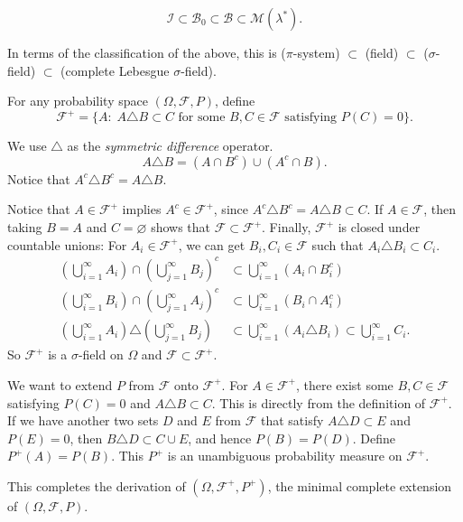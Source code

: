 \documentclass[11pt,fleqn]{book} %
\begin{document}
\[
	\mathcal{I} \subset \mathcal{B}_0 \subset \mathcal{B} \subset \mathcal{M}(\lambda^*).
\]

In terms of the classification of the above, this is ($\pi$-system) $\subset$ (field) $\subset$ ($\sigma$-field) $\subset$ (complete Lebesgue $\sigma$-field).

For any probability space $(\Omega,\mathcal{F},P)$, define
\[
	\mathcal{F}^+ = \{A:\;A \triangle B \subset C \textrm{ for some } B,C \in \mathcal{F} \textrm{ satisfying } P(C)=0\}.
\]
\begin{remark}\label{rem:sym-diff}
	We use $\triangle$ as the \emph{symmetric difference} operator.
	\[
		A \triangle B = (A \cap B^c) \cup (A^c \cap B).
	\]
	Notice that $A^c \triangle B^c = A \triangle B$.
\end{remark}

Notice that $A \in \mathcal{F}^+$ implies $A^c \in \mathcal{F}^+$, since $A^c \triangle B^c = A \triangle B \subset C$. If $A \in \mathcal{F}$, then taking $B=A$ and $C=\varnothing$ shows that $\mathcal{F} \subset \mathcal{F}^+$. Finally, $\mathcal{F}^+$ is closed under countable unions: For $A_i \in \mathcal{F}^+$, we can get $B_i,C_i \in \mathcal{F}$ such that $A_i \triangle B_i \subset C_i$.
\begin{align*}
	\left( \bigcup_{i=1}^\infty A_i \right) \cap \left( \bigcup_{j=1}^\infty B_j \right)^c &\subset \bigcup_{i=1}^\infty (A_i \cap B_i^c) \\
	\left( \bigcup_{i=1}^\infty B_i \right) \cap \left( \bigcup_{j=1}^\infty A_j \right)^c &\subset \bigcup_{i=1}^\infty (B_i \cap A_i^c) \\
	\left( \bigcup_{i=1}^\infty A_i \right) \triangle \left( \bigcup_{j=1}^\infty B_j \right) &\subset \bigcup_{i=1}^\infty (A_i \triangle B_i) \subset \bigcup_{i=1}^\infty C_i.
\end{align*}
So $\mathcal{F}^+$ is a $\sigma$-field on $\Omega$ and $\mathcal{F} \subset \mathcal{F}^+$.

We want to extend $P$ from $\mathcal{F}$ onto $\mathcal{F}^+$. For $A \in \mathcal{F}^+$, there exist some $B,C \in \mathcal{F}$ satisfying $P(C)=0$ and $A \triangle B \subset C$. This is directly from the definition of $\mathcal{F}^+$. If we have another two sets $D$ and $E$ from $\mathcal{F}$ that satisfy $A \triangle D \subset E$ and $P(E)=0$, then $B \triangle D \subset C \cup E$, and hence $P(B)=P(D)$. Define $P^+(A)=P(B)$. This $P^+$ is an unambiguous probability measure on $\mathcal{F}^+$.

This completes the derivation of $(\Omega,\mathcal{F}^+,P^+)$, the minimal complete extension of $(\Omega,\mathcal{F},P)$.
\end{document}
